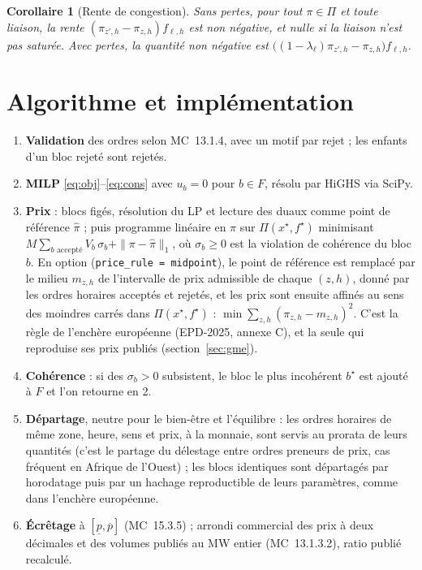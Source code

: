 \documentclass[a4paper,12pt]{article}
\newtheorem{corollary}{Corollaire}
\theoremstyle{definition}
\newcommand{\MC}[1]{MC~#1}
\begin{document}
\begin{corollary}[Rente de congestion]
Sans pertes, pour tout $\pi\in\Pi$ et toute liaison, la rente $(\pi_{z',h}-\pi_{z,h})f_{\ell,h}$ est non négative, et nulle si la liaison n'est pas saturée. Avec pertes, la quantité non négative est $\big((1-\lambda_\ell)\pi_{z',h}-\pi_{z,h}\big)f_{\ell,h}$.
\end{corollary}

\section{Algorithme et implémentation}\label{sec:algo}

\begin{enumerate}
\item \textbf{Validation} des ordres selon \MC{13.1.4}, avec un motif par rejet ; les enfants d'un bloc rejeté sont rejetés.
\item \textbf{MILP} \eqref{eq:obj}--\eqref{eq:cons} avec $u_b=0$ pour $b\in F$, résolu par HiGHS \citep{huangfu2018highs} via SciPy.
\item \textbf{Prix} : blocs figés, résolution du LP et lecture des duaux comme point de référence $\hat\pi$ ; puis programme linéaire en $\pi$ sur $\Pi(x^\star,f^\star)$ minimisant $M\sum_{b\text{ accepté}}V_b\,\sigma_b + \|\pi-\hat\pi\|_1$, où $\sigma_b\ge0$ est la violation de cohérence du bloc $b$. En option (\texttt{price\_rule = midpoint}), le point de référence est remplacé par le milieu $m_{z,h}$ de l'intervalle de prix admissible de chaque $(z,h)$, donné par les ordres horaires acceptés et rejetés, et les prix sont ensuite affinés au sens des moindres carrés dans $\Pi(x^\star,f^\star)$ : $\min\sum_{z,h}(\pi_{z,h}-m_{z,h})^2$. C'est la règle de l'enchère européenne (EPD-2025, annexe C), et la seule qui reproduise ses prix publiés (section~\ref{sec:gme}).
\item \textbf{Cohérence} : si des $\sigma_b>0$ subsistent, le bloc le plus incohérent $b^\star$ est ajouté à $F$ et l'on retourne en 2.
\item \textbf{Départage}, neutre pour le bien-être et l'équilibre : les ordres horaires de même zone, heure, sens et prix, à la monnaie, sont servis au prorata de leurs quantités (c'est le partage du délestage entre ordres preneurs de prix, cas fréquent en Afrique de l'Ouest) ; les blocs identiques sont départagés par horodatage puis par un hachage reproductible de leurs paramètres, comme dans l'enchère européenne.
\item \textbf{Écrêtage} à $[\underline p,\overline p]$ (\MC{15.3.5}) ; arrondi commercial des prix à deux décimales et des volumes publiés au MW entier (\MC{13.1.3.2}), ratio publié recalculé.

\end{enumerate}
\end{document}
